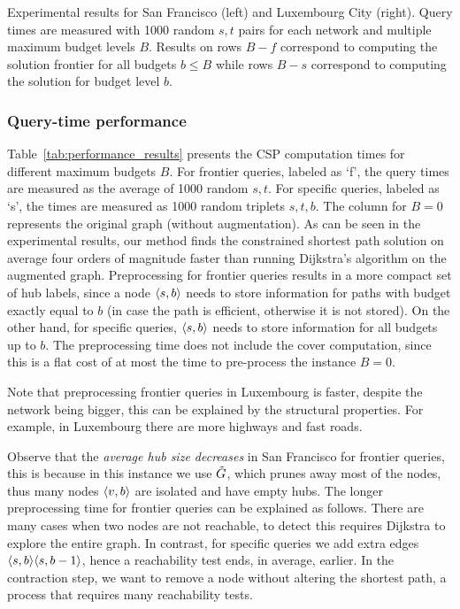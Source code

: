 \documentclass[opre,nonblindrev]{informs3} %
\begin{document}
\begin{table}[h]
\caption{Experimental results for San Francisco (left) and Luxembourg City (right). Query times are measured with 1000 random $s,t$ pairs for each network and multiple maximum budget levels $B$. Results on rows $B-f$ correspond to computing the solution frontier for all budgets $b\leq B$ while rows $B-s$ correspond to computing the solution for budget level $b$.}
\label{tab:performance_results}
\end{table}

\subsubsection{Query-time performance}


Table~\ref{tab:performance_results} presents the CSP computation times for different maximum budgets $B$. 
For frontier queries, labeled as `f', the query times are measured as the average of 1000 random $s,t$.
For specific queries, labeled as `s', the times are measured as 1000 random triplets $s,t,b$.
The column for $B=0$ represents the original graph (without augmentation). 
As can be seen in the experimental results, our method finds the constrained shortest path solution on average four orders of magnitude faster than running Dijkstra's algorithm on the augmented graph. 
Preprocessing for frontier queries results in a more compact set of hub labels, since a node $\langle s,b\rangle$ needs to store information for paths with budget exactly equal to $b$ (in case the path is efficient, otherwise it is not stored).
On the other hand, for specific queries, $\langle s,b\rangle$ needs to store information for all budgets up to $b$.
The preprocessing time does not include the cover computation, since this is a flat cost of at most the time to pre-process the instance $B=0$.

Note that preprocessing frontier queries in Luxembourg is faster, despite the network being bigger, this can be explained by the structural properties.
For example, in Luxembourg there are more highways and fast roads.

Observe that the \emph{average hub size decreases} in San Francisco for frontier queries, this is because in this instance we use $\tilde G$, which prunes away most of the nodes, thus many nodes $\langle v,b\rangle$ are isolated and have empty hubs.
The longer preprocessing time for frontier queries can be explained as follows.
There are many cases when two nodes are not reachable, to detect this requires Dijkstra to explore the entire graph.
In contrast, for specific queries we add extra edges $\langle s,b\rangle\langle s,b-1\rangle$, hence a reachability test ends, in average, earlier.
In the contraction step, we want to remove a node without altering the shortest path, a process that requires many reachability tests.
\end{document}
